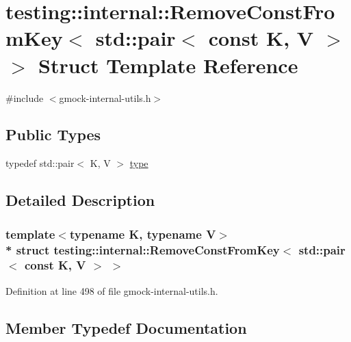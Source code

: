 \hypertarget{structtesting_1_1internal_1_1_remove_const_from_key_3_01std_1_1pair_3_01const_01_k_00_01_v_01_4_01_4}{}\section{testing\+:\+:internal\+:\+:Remove\+Const\+From\+Key$<$ std\+:\+:pair$<$ const K, V $>$ $>$ Struct Template Reference}
\label{structtesting_1_1internal_1_1_remove_const_from_key_3_01std_1_1pair_3_01const_01_k_00_01_v_01_4_01_4}


{\ttfamily \#include $<$gmock-\/internal-\/utils.\+h$>$}

\subsection*{Public Types}
\begin{DoxyCompactItemize}
\item 
typedef std\+::pair$<$ K, V $>$ \hyperlink{structtesting_1_1internal_1_1_remove_const_from_key_3_01std_1_1pair_3_01const_01_k_00_01_v_01_4_01_4_ac1d76274964aa8172889a4714246e86f}{type}
\end{DoxyCompactItemize}


\subsection{Detailed Description}
\subsubsection*{template$<$typename K, typename V$>$\\*
struct testing\+::internal\+::\+Remove\+Const\+From\+Key$<$ std\+::pair$<$ const K, V $>$ $>$}



Definition at line 498 of file gmock-\/internal-\/utils.\+h.



\subsection{Member Typedef Documentation}
